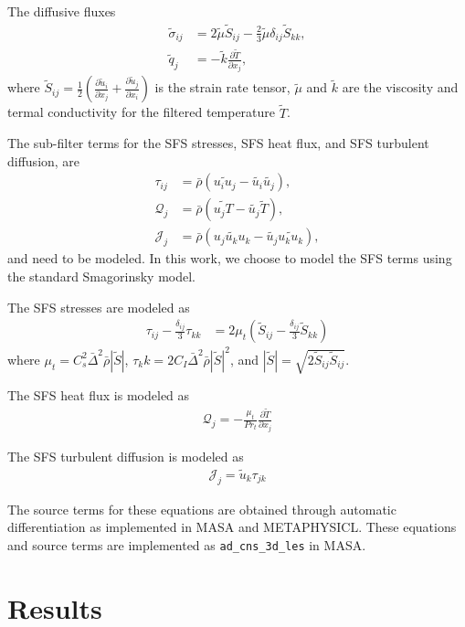 \documentclass[10pt]{article}
\newcommand{\pfrac}[2]{\frac{\partial#1}{\partial#2}}
\newcommand{\wt}[1]{\widetilde{#1}}
\begin{document}
The diffusive fluxes
\begin{align}
  \wt{\sigma}_{ij} &= 2 \wt{\mu} \wt{S}_{ij} - \frac{2}{3} \wt{\mu} \delta_{ij}  \wt{S}_{kk},\\
  \wt{q}_j &= - \wt{k} \pfrac{\wt{T}}{x_j},
\end{align}
where $\wt{S}_{ij} = \frac{1}{2} \left( \pfrac{\wt{u}_i}{x_j} +
\pfrac{\wt{u}_j}{x_i}\right)$ is the strain rate tensor, $\wt{\mu}$
and $\wt{k}$ are the viscosity and termal conductivity for the
filtered temperature $\wt{T}$.

The sub-filter terms for the SFS stresses, SFS heat flux, and SFS
turbulent diffusion, are
\begin{align}
  \tau_{ij} &= \bar{\rho} \left(\wt{u_i u_j} - \wt{u_i}\wt{u_j}\right),\\
  \mathcal{Q}_j &= \bar{\rho} \left(\wt{u_j T} - \wt{u_j}\wt{T}\right),\\
  \mathcal{J}_j &= \bar{\rho} \left(\wt{u_j u_k u_k} - \wt{u_j}\wt{u_k u_k}\right),
\end{align}
and need to be modeled. In this work, we choose to model the SFS terms
using the standard Smagorinsky model.

The SFS stresses are modeled as
\begin{align}
  \tau_{ij} - \frac{\delta_{ij}}{3} \tau_{kk} &= 2 \mu_t \left(\wt{S}_{ij} - \frac{\delta_{ij}}{3}  \wt{S}_{kk} \right)
\end{align}
where $\mu_t = C_s^2 \bar{\Delta}^2 \bar{\rho} |\wt{S}|$, $\tau_kk = 2
C_I \bar{\Delta}^2 \bar{\rho} |\wt{S}|^2$, and $|\wt{S}| = \sqrt{2
  \wt{S}_{ij}\wt{S}_{ij}}$.

The SFS heat flux is modeled as
\begin{align}
  \mathcal{Q}_j = - \frac{\mu_t}{Pr_t} \pfrac{\wt{T}}{x_j}
\end{align}

The SFS turbulent diffusion is modeled as
\begin{align}
  \mathcal{J}_j = \wt{u}_k \tau_{jk}
\end{align}

The source terms for these equations are obtained through automatic
differentiation as implemented in MASA and METAPHYSICL. These
equations and source terms are implemented as
\texttt{ad\_cns\_3d\_les} in MASA.

\section{Results}
\end{document}
